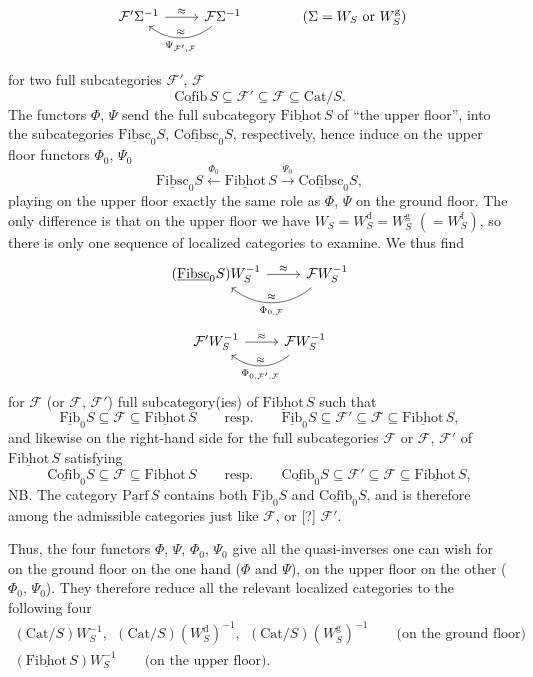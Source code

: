 \documentclass[11pt]{article}
\newcommand{\printedpage}[1]{\marginpar{\footnotesize p.~#1}}
\newcommand{\msp}[1]{\marginpar{\footnotesize [#1]}}
\newcommand{\usl}[1]{\underline{\mathrm{#1}}}
\begin{document}
\printedpage{49}

\[
\begin{tikzcd}
\mathcal{F}'\Sigma^{-1} \arrow[r, "\approx"] & \mathcal{F}\Sigma^{-1} \arrow[l, bend left=40, "\approx"', "\Psi_{\mathcal{F}',\mathcal{F}}"]
\end{tikzcd}
\qquad\qquad (\Sigma = W_S \text{ or } W_S^{\mathrm{g}})
\]

for two full subcategories $\mathcal{F}'$, $\mathcal{F}$
\[
\usl{Cofib}\,S \subseteq \mathcal{F}' \subseteq \mathcal{F} \subseteq \mathrm{Cat}/S.
\]
The functors $\Phi$, $\Psi$ send the full subcategory $\usl{Fibhot}\,S$ of ``the upper floor'', into the subcategories $\usl{Fibsc}_0S$, $\usl{Cofibsc}_0S$, respectively, hence induce on the upper floor functors $\Phi_0$, $\Psi_0$
\[
\usl{Fibsc}_0S \xleftarrow{\Phi_0} \usl{Fibhot}\,S \xrightarrow{\Psi_0} \usl{Cofibsc}_0S,
\]
playing on the upper floor exactly the same role as $\Phi$, $\Psi$ on the ground floor. The only difference is that on the upper floor we have $W_S = W_S^{\mathrm{d}} = W_S^{\mathrm{g}}$ $(= W_S^{\mathrm{f}})$,
\msp{page 78}
so there is only one sequence of localized categories to examine. We thus find
\[
\begin{tikzcd}
(\usl{Fibsc}_0S)W_S^{-1} \arrow[r, "\approx"] & \mathcal{F}W_S^{-1} \arrow[l, bend left=40, "\approx"', "\Phi_{0,\mathcal{F}}"]
\end{tikzcd}
\]
\[
\begin{tikzcd}
\mathcal{F}'W_S^{-1} \arrow[r, "\approx"] & \mathcal{F}W_S^{-1} \arrow[l, bend left=40, "\approx"', "\Phi_{0,\mathcal{F}',\mathcal{F}}"]
\end{tikzcd}
\]
for $\mathcal{F}$ (or $\mathcal{F}$, $\mathcal{F}'$) full subcategory(ies) of $\usl{Fibhot}\,S$ such that
\[
\usl{Fib}_0S \subseteq \mathcal{F} \subseteq \usl{Fibhot}\,S \qquad\text{resp.}\qquad \usl{Fib}_0S \subseteq \mathcal{F}' \subseteq \mathcal{F} \subseteq \usl{Fibhot}\,S,
\]
and likewise on the right-hand side for the full subcategories $\mathcal{F}$ or $\mathcal{F}$, $\mathcal{F}'$ of $\usl{Fibhot}\,S$ satisfying
\[
\usl{Cofib}_0S \subseteq \mathcal{F} \subseteq \usl{Fibhot}\,S \qquad\text{resp.}\qquad \usl{Cofib}_0S \subseteq \mathcal{F}' \subseteq \mathcal{F} \subseteq \usl{Fibhot}\,S,
\]
NB. The category $\usl{Parf}\,S$ contains both $\usl{Fib}_0S$ and $\usl{Cofib}_0S$, and is therefore among the admissible categories just like $\mathcal{F}$, or [?] $\mathcal{F}'$.

Thus, the four functors $\Phi$, $\Psi$, $\Phi_0$, $\Psi_0$ give all the quasi-inverses one can wish for on the ground floor on the one hand ($\Phi$ and $\Psi$), on the upper floor on the other ($\Phi_0$, $\Psi_0$). They therefore reduce all the relevant localized categories to the following four
\[
\begin{gathered}
(\mathrm{Cat}/S)W_S^{-1},\ \ (\mathrm{Cat}/S)(W_S^{\mathrm{d}})^{-1},\ \ (\mathrm{Cat}/S)(W_S^{\mathrm{g}})^{-1} \qquad \text{(on the ground floor)}\\
(\usl{Fibhot}\,S)W_S^{-1} \qquad \text{(on the upper floor).}
\end{gathered}
\]
\end{document}
